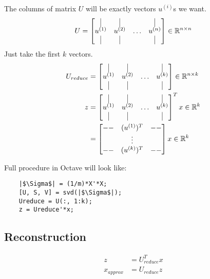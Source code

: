 The columns of matrix $U$ will be exactly vectors $u^{(i)}$s we want.
\begin{equation*}
	U = \begin{bmatrix}
		\vline  & \vline  &       & \vline  \\
		u^{(1)} & u^{(2)} & \dots & u^{(n)} \\
		\vline  & \vline  &       & \vline  \\
	\end{bmatrix} \in \R^{n \times n}
\end{equation*}
Just take the first $k$ vectors.
\begin{align*}
	U_{reduce} & = \begin{bmatrix}
		\vline  & \vline  &       & \vline  \\
		u^{(1)} & u^{(2)} & \dots & u^{(k)} \\
		\vline  & \vline  &       & \vline  \\
	\end{bmatrix} \in \R^{n \times k} \\
	z          & = \begin{bmatrix}
		\vline  & \vline  &       & \vline  \\
		u^{(1)} & u^{(2)} & \dots & u^{(k)} \\
		\vline  & \vline  &       & \vline  \\
	\end{bmatrix}^Tx \in \R^k         \\
	           & = \begin{bmatrix}
		-- & (u^{(1)})^T & -- \\
		   & \vdots      &    \\
		-- & (u^{(k)})^T & -- \\
	\end{bmatrix}x \in \R^k           \\
\end{align*}

Full procedure in Octave will look like:
\begin{verbatim}
	|$\Sigma$| = (1/m)*X'*X;
	[U, S, V] = svd(|$\Sigma$|);
	Ureduce = U(:, 1:k);
	z = Ureduce'*x;
\end{verbatim}

\subsection{Reconstruction}
\begin{align*}
	z          & = U_{reduce}^Tx \\
	x_{approx} & = U_{reduce}z   \\
\end{align*}

